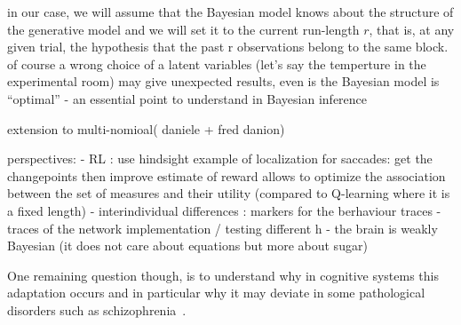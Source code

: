 \documentclass[12pt,english]{article}%
\newcommand{\citep}[1]{\parencite{#1}}
\begin{document}
in our case, we will assume that the Bayesian model knows about the structure of the generative model and we will set it to the current run-length $r$, that is, at any given trial, the hypothesis that the past r observations belong to the same block. of course a wrong choice of a latent variables (let's say the temperture in the experimental room) may give unexpected results, even is the Bayesian model is ``optimal'' - an essential point to understand in Bayesian inference

extension to multi-nomioal( daniele + fred danion)





perspectives:
- RL : use hindsight example of localization for saccades: get the changepoints then improve estimate of reward allows to optimize the association between the set of measures and their utility (compared to Q-learning where it is a fixed length)
- interindividual differences : markers for the berhaviour traces - traces of the network implementation / testing different h
- the brain is weakly Bayesian (it does not care about equations but more about sugar)


One remaining question though, is to understand why in cognitive systems
this adaptation occurs and
in particular why it may deviate
in some pathological disorders such as schizophrenia~\citep{Adams12}.

\end{document}
